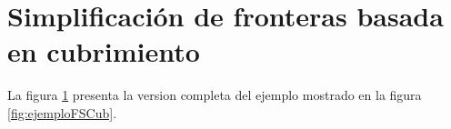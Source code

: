 \section{Simplificación de fronteras basada en cubrimiento}\label{EXE:sfbc}
La figura \ref{EXE:sfbc} presenta la version completa del ejemplo mostrado en la figura \ref{fig:ejemploFSCub}.
\endgroup
\begin{figure}[H]
  \centerfloat


\end{figure}
